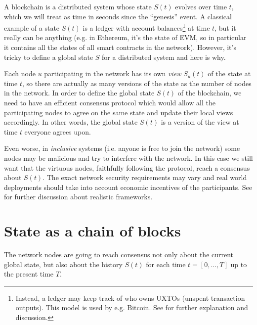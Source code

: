 \documentclass[a4paper]{article}
\begin{document}
A blockchain is a distributed system whose state $S(t)$ evolves over time $t$, which we will treat  as time in seconds since the ``genesis'' event. A classical example of a state $S(t)$ is a ledger with account balances\footnote{Instead, a ledger may keep track of who owns UXTOs (unspent transaction outputs). This model is used by e.g. Bitcoin. See \cite{UXTO} for further explanation and discussion. } at time $t$, but it really can be anything (e.g. in Ethereum, it's the state of EVM, so in particular it contains all the states of all smart contracts in the network).
However, it's tricky to define a global state $S$ for a distributed system and here is why.

Each node $u$ participating in the network has its own \emph{view} $S_u(t)$ of the state at time $t$, so there are actually as many versions of the state as the number of nodes in the network. In order to define the global state $S(t)$ of the blockchain, we need to have an efficient consensus protocol which would allow all the participating nodes to agree on the same state and update their local views accordingly. In other words, the global state $S(t)$ is a version of the view at time $t$ everyone agrees upon. 

Even worse, in \emph{inclusive} systems (i.e. anyone is free to join the network) some nodes may be malicious and try to interfere with the network. In this case we still want that the virtuous nodes, faithfully following the protocol, reach a consensus about $S(t)$. The exact network security requirements may vary and real world deployments should take into account economic incentives of the participants. See \cite{ButerinSecurityFrameworks} for further discussion about realistic frameworks.

\section{State as a chain of blocks} \label{sec:chain}
 The network nodes are going to reach consensus not only about the current global state, but also about the history $S(t)$ for each time $t = [0, \ldots, T]$ up to the present time $T$. 
  
  
\end{document}
